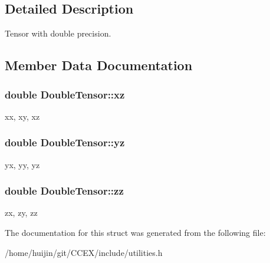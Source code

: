 \subsection{Detailed Description}
Tensor with double precision. 

\subsection{Member Data Documentation}
\hypertarget{structDoubleTensor_a78677cd002a23db74c7438a9e51aa264}{
\subsubsection[{xz}]{\setlength{\rightskip}{0pt plus 5cm}double Double\-Tensor\-::xz}}\label{structDoubleTensor_a78677cd002a23db74c7438a9e51aa264}
xx, xy, xz \hypertarget{structDoubleTensor_a0311ca5318233d1cd146c7f2ba0564a2}{
\subsubsection[{yz}]{\setlength{\rightskip}{0pt plus 5cm}double Double\-Tensor\-::yz}}\label{structDoubleTensor_a0311ca5318233d1cd146c7f2ba0564a2}
yx, yy, yz \hypertarget{structDoubleTensor_af3fec476b850d04a0f1e7a4cfbaceb2d}{
\subsubsection[{zz}]{\setlength{\rightskip}{0pt plus 5cm}double Double\-Tensor\-::zz}}\label{structDoubleTensor_af3fec476b850d04a0f1e7a4cfbaceb2d}
zx, zy, zz 

The documentation for this struct was generated from the following file\-:\begin{DoxyCompactItemize}
\item 
/home/huijin/git/\-C\-C\-E\-X/include/utilities.\-h\end{DoxyCompactItemize}
